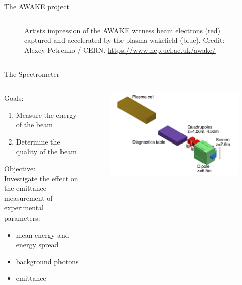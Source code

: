 \documentclass[aspectratio=169]{beamer}
\begin{document}
\begin{frame}{The AWAKE project}
\begin{columns}
\begin{column}{.5\linewidth}
\begin{figure}[h]
				\caption{Artists impression of the AWAKE witness beam electrons
				(red) captured and accelerated by the plasma wakefield (blue).
				Credit: Alexey Petrenko / CERN. \url{https://www.hep.ucl.ac.uk/awake/}}
			\end{figure}
		\end{column}
	\end{columns}

\end{frame}

\begin{frame}{The Spectrometer}
	\begin{columns}
		\begin{column}{0.5\linewidth}
			Goals:
			\begin{enumerate}
				\item Measure the energy of the beam
				\item Determine the quality of the beam
			\end{enumerate}
			\vspace{1em}
			Objective:\\
			\hspace*{18pt} Investigate the effect on the emittance measurement of
			experimental parameters:
			\begin{itemize}
				\item mean energy and energy spread
				\item background photons
				\item emittance
			\end{itemize}
		\end{column}
		\begin{column}{0.5\linewidth}
			\begin{figure}[h]
				\centering
				\includegraphics[width=\linewidth]{spectrometer}

\end{figure}
\end{column}
\end{columns}
\end{frame}
\end{document}
